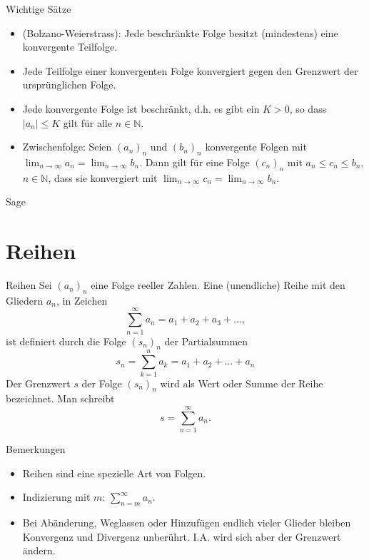 \documentclass[notes=hide,hyperref={dvipdfmx,pdfpagelabels=false}]{beamer}
\begin{document}
\begin{frame}{Wichtige Sätze}
\begin{itemize}
\item \alert{(Bolzano-Weierstrass)}: Jede beschränkte Folge besitzt (mindestens) eine
konvergente Teilfolge.
\item Jede Teilfolge einer konvergenten Folge konvergiert gegen den
Grenzwert der ursprünglichen Folge.
\item Jede konvergente Folge ist beschränkt, d.h. es gibt ein $K>0$,
so dass $|a_n|\leq K$ gilt für alle $n \in \mathbb{N}$.
\item \alert{Zwischenfolge}: Seien $(a_n)_n$ und $(b_n)_n$ konvergente Folgen mit $\lim_{n
\rightarrow \infty} a_n = \lim_{n \rightarrow \infty} b_n$. Dann gilt
für eine Folge $(c_n)_n$ mit $a_n \leq c_n \leq b_n$, $n \in
\mathbb{N}$, dass sie konvergiert mit  $\lim_{n
\rightarrow \infty} c_n = \lim_{n \rightarrow \infty} b_n$.
\end{itemize}
\end{frame}

\begin{frame}{Sage}
    \begin{center}
        \url{}
    \end{center}
\end{frame}


\section{Reihen}

\begin{frame}{Reihen}
Sei $(a_n)_n$ eine Folge reeller Zahlen. Eine {\color{red} (unendliche)
Reihe} mit den {\color{red} Gliedern} $a_n$, in Zeichen
\[ \sum_{n=1}^\infty a_n =a_1 + a_2 + a_3 + \dots, \]
ist definiert durch die Folge $(s_n)_n$ der {\color{red} Partialsummen}\\
\[
s_n=\sum_{k=1}^n a_k = a_1+a_2+ \dots +a_n 
\]
Der Grenzwert $s$ der Folge $(s_n)_n$ wird als {\color{red} Wert} oder 
{\color{red} Summe} der Reihe bezeichnet. Man schreibt
\[s= \sum_{n=1}^\infty a_n.\] 
\end{frame}

\begin{frame}{Bemerkungen}
\begin{itemize}
\item  Reihen sind eine spezielle Art von Folgen.
\item Indizierung mit $m$: $\sum_{n=m}^\infty a_n$.
\item Bei Abänderung, Weglassen oder Hinzufügen endlich vieler Glieder
bleiben Konvergenz und Divergenz unberührt. I.A. wird sich aber der
Grenzwert ändern.
\end{itemize}
\end{frame}
\end{document}

